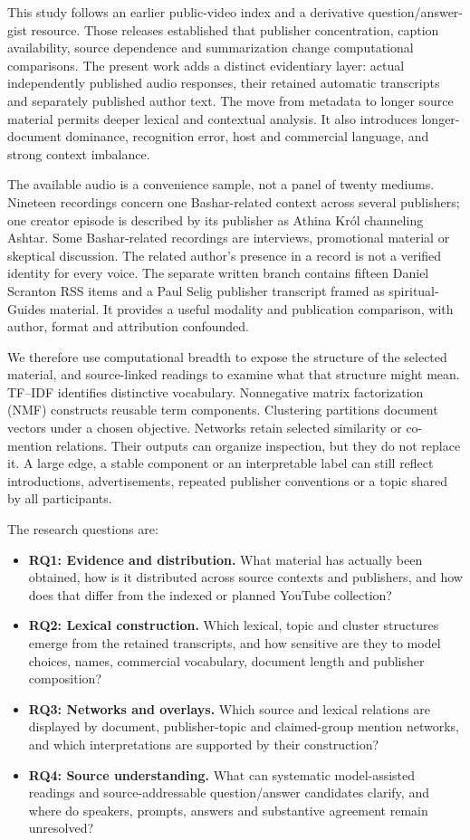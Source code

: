 This study follows an earlier public-video index and a derivative question/answer-gist resource. Those releases established that publisher concentration, caption availability, source dependence and summarization change computational comparisons. The present work adds a distinct evidentiary layer: actual independently published audio responses, their retained automatic transcripts and separately published author text. The move from metadata to longer source material permits deeper lexical and contextual analysis. It also introduces longer-document dominance, recognition error, host and commercial language, and strong context imbalance.

The available audio is a convenience sample, not a panel of twenty mediums. Nineteen recordings concern one Bashar-related context across several publishers; one creator episode is described by its publisher as Athina Kr\'ol channeling Ashtar. Some Bashar-related recordings are interviews, promotional material or skeptical discussion. The related author's presence in a record is not a verified identity for every voice. The separate written branch contains fifteen Daniel Scranton RSS items and a Paul Selig publisher transcript framed as spiritual-Guides material. It provides a useful modality and publication comparison, with author, format and attribution confounded.

We therefore use computational breadth to expose the structure of the selected material, and source-linked readings to examine what that structure might mean. TF--IDF identifies distinctive vocabulary. Nonnegative matrix factorization (NMF) constructs reusable term components. Clustering partitions document vectors under a chosen objective. Networks retain selected similarity or co-mention relations. Their outputs can organize inspection, but they do not replace it. A large edge, a stable component or an interpretable label can still reflect introductions, advertisements, repeated publisher conventions or a topic shared by all participants.

The research questions are:
\begin{itemize}
\item \textbf{RQ1: Evidence and distribution.} What material has actually been obtained, how is it distributed across source contexts and publishers, and how does that differ from the indexed or planned YouTube collection?
\item \textbf{RQ2: Lexical construction.} Which lexical, topic and cluster structures emerge from the retained transcripts, and how sensitive are they to model choices, names, commercial vocabulary, document length and publisher composition?
\item \textbf{RQ3: Networks and overlays.} Which source and lexical relations are displayed by document, publisher-topic and claimed-group mention networks, and which interpretations are supported by their construction?
\item \textbf{RQ4: Source understanding.} What can systematic model-assisted readings and source-addressable question/answer candidates clarify, and where do speakers, prompts, answers and substantive agreement remain unresolved?
\end{itemize}

